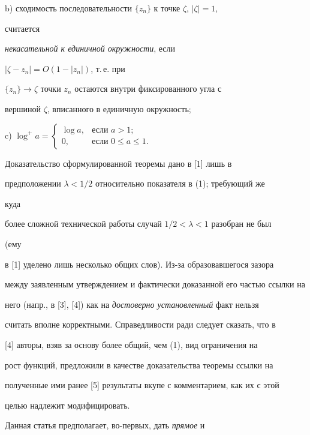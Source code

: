  


b) сходимость последовательности $\{z_n\}$ к точке $\zeta$, $|\zeta|=1$, 


считается 


{\it некасательной к единичной окружности}, если 


$|\zeta-z_n|=O(1-|z_n|)$, т.\,е. при 


$\{z_n\}\to\zeta$ точки $z_n$ остаются внутри фиксированного угла с 


вершиной $\zeta$, вписанного в единичную окружность;


 


c) $\log^+a=\begin{cases} 


\log a, & \text{если }a>1;\\ 


0, & \text{если }0\le a\le1. 


\end{cases}$ 


 


Доказательство сформулированной теоремы дано в [1] лишь в 


предположении $\lambda<1/2$ относительно показателя в (1); требующий же 


куда 


более сложной технической работы случай $1/2<\lambda<1$ разобран не был 


(ему 


в [1] уделено лишь несколько общих слов). Из-за образовавшегося зазора 


между заявленным утверждением и фактически доказанной его частью ссылки на 


него (напр., в [3], [4]) как на {\it достоверно установленный} факт нельзя 


считать вполне корректными. Справедливости ради следует сказать, что в 


[4] авторы, взяв за основу более общий, чем (1), вид ограничения на 


рост функций, предложили в качестве доказательства теоремы ссылки на


полученные ими ранее [5] результаты вкупе с комментарием, как их с этой 


целью надлежит модифицировать. 


 


Данная статья предполагает, во-первых, дать {\it прямое} и 


